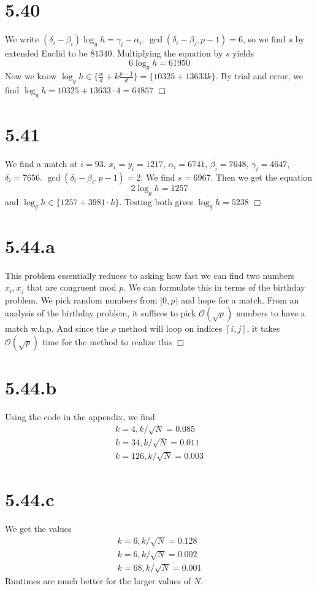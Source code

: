 \documentclass{article}
\begin{document}
\section*{5.40}
We write $(\delta_i-\beta_i)\log_g h = \gamma_i - \alpha_i$. $\gcd(\delta_i-\beta_i, p-1) = 6$, so we find $s$ by extended Euclid to be $81340$. Multiplying the equation by $s$ yields
$$6 \log_g h = 61950$$
Now we know $\log_g h \in \{\frac{w}{d} + k\frac{p-1}{d}\} = \{10325 + 13633k\}$. By trial and error, we find $\log_g h = 10325 + 13633 \cdot 4 = 64857$ $\Box$

\section*{5.41}
We find a match at $i = 93$. $x_i = y_i = 1217$, $\alpha_i = 6741$, $\beta_i = 7648$, $\gamma_i = 4647$, $\delta_i = 7656$. $\gcd(\delta_i-\beta_i, p-1) = 2$. We find $s = 6967$. Then we get the equation
$$2 \log_g h = 1257$$
and $\log_g h \in \{1257 + 3981 \cdot k\}$. Testing both gives $\log_g h = 5238$ $\Box$

\section*{5.44.a}
This problem essentially reduces to asking how fast we can find two numbers $x_i,x_j$ that are congruent mod $p$. We can formulate this in terms of the birthday problem. We pick random numbers from $[0,p)$ and hope for a match. From an analysis of the birthday problem, it suffices to pick $\mathcal{O}(\sqrt{p})$ numbers to have a match w.h.p. And since the $\rho$ method will loop on indices $[i,j]$, it takes $\mathcal{O}(\sqrt{p})$ time for the  method to realize this $\Box$

\section*{5.44.b}
Using the code in the appendix, we find
\begin{gather*}
k = 4, k/\sqrt{N} = 0.085\\
k = 34, k/\sqrt{N} = 0.011\\
k = 126, k/\sqrt{N} = 0.003
\end{gather*}

\section*{5.44.c}
We get the values
\begin{gather*}
k = 6, k/\sqrt{N} = 0.128\\
k = 6, k/\sqrt{N} = 0.002\\
k = 68, k/\sqrt{N} = 0.001
\end{gather*}
Runtimes are much better for the larger values of $N$.
\end{document}
